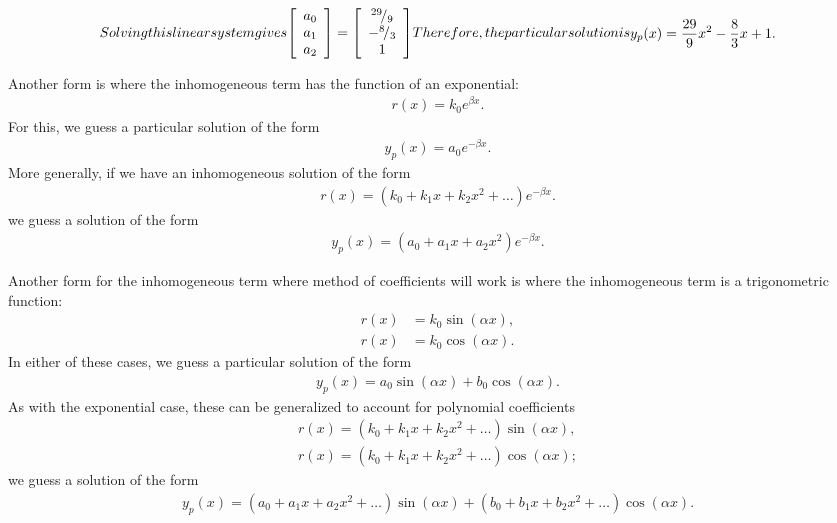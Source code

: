 \begin{subequations}
\begin{align}
\end{align}
Solving this linear system gives
\begin{align}
   \left[ \begin{array}{c} a_0 \\ a_1 \\ a_2 \\ \end{array} \right] =
   \left[ \begin{array}{c} \rfrac{29}{9} \\ -\rfrac{8}{3} \\ 1 \\ \end{array} \right]
\end{align}
Therefore, the particular solution is
\begin{align}
  y_p(x) = \frac{29}{9} x^2 - \frac{8}{3} x + 1.
\end{align}
\end{subequations}

Another form is where the inhomogeneous term has the function of an exponential:
\begin{align}
  r(x) = k_0 e^{\beta x}.
\end{align}
For this, we guess a particular solution of the form
\begin{align}
  y_p(x) = a_0 e^{-\beta x}.
\end{align}
More generally, if we have an inhomogeneous solution of the form
\begin{align}
  r(x) = ( k_0 + k_1 x + k_2 x^2 + \ldots ) e^{-\beta x}.
\end{align}
we guess a solution of the form
\begin{align}
  y_p(x) = ( a_0 + a_1 x + a_2 x^2 ) e^{-\beta x}.
\end{align}

Another form for the inhomogeneous term where method of coefficients will work is where the inhomogeneous term is a trigonometric function:
\begin{align}
  r(x) &= k_0 \sin( \alpha x ), \nonumber \\
  r(x) &= k_0 \cos( \alpha x ).
\end{align}
In either of these cases, we guess a particular solution of the form
\begin{align}
  y_p(x) = a_0 \sin( \alpha x ) + b_0 \cos( \alpha x ).
\end{align}
As with the exponential case, these can be generalized to account for polynomial coefficients
\begin{align}
  r(x) = ( k_0 + k_1 x + k_2 x^2 + \ldots ) \sin( \alpha x ), \nonumber \\
  r(x) = ( k_0 + k_1 x + k_2 x^2 + \ldots ) \cos( \alpha x );
\end{align}
we guess a solution of the form
\begin{align}
  y_p(x) = ( a_0 + a_1 x + a_2 x^2 + \ldots ) \sin( \alpha x ) + ( b_0 + b_1 x + b_2 x^2 + \ldots )  \cos( \alpha x ).
\end{align}

